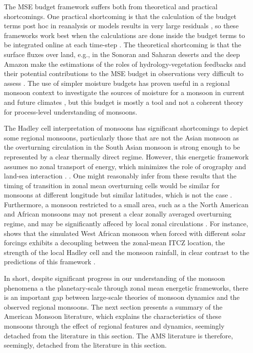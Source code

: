  The MSE budget framework suffers both from theoretical and practical shortcomings. One practical shortcoming is that the calculation of the budget terms post hoc in reanalysis or models results in very large residuals \citep{hill2019}, so these frameworks work best when the calculations are done inside the budget terms to be integrated online at each time-step \citep[e.g.][]{ma2019}.
The theoretical shortcoming is that the surface fluxes over land, e.g., in the Sonoran and Saharan deserts and the deep Amazon make the estimations of the roles of hydrology-vegetation feedbacks and their potential contributions to the MSE budget in observations very difficult to assess \citep{boos2016,pascale2019}. The use of simpler moisture budgets has proven useful in a regional monsoon context to investigate the sources of moisture for a monsoon in current  \citep{ordonez2019,martinez2019} and future climates \citep{smyth2020}, but this budget is mostly a tool and not a coherent theory for process-level understanding of monsoons.

 
The Hadley cell interpretation of monsoons has significant shortcomings to depict some regional monsoons, particularly those that are not the Asian monsoon as the overturning circulation in the South Asian monsoon is strong enough to be represented by a clear thermally direct regime.
However, this energetic framework assumes no zonal transport of energy, which minimizes the role of orography and land-sea interaction \citep{biasutti2018global}.
. One might reasonably infer from these results that the timing of transition in zonal mean overturning cells would be similar for monsoons at different longitude but similar latitudes, which is not the case \citep{wang2017}.
Furthermore, a monsoon restricted to a small area, such as a the North American and African monsoons may not present a clear zonally averaged overturning regime, and may be significantly affeced by local zonal circulations \citep{zhai2015regime}. For instance, \cite{smyth2018simulated} shows that the simulated West African monsoon when forced with different solar forcings exhibits a decoupling between the zonal-mean ITCZ location, the strength of the local Hadley cell and the monsoon rainfall, in clear contrast to the predictions of this framework \citep{bordoni2008monsoons}.


In short, despite significant progress in our understanding of the monsoon phenomena a the planetary-scale through zonal mean energetic frameworks, there is an important gap between large-scale theories of monsoon dynamics and the observed regional monsoons. 
The next section presents a summary of the American Monsoon literature, which explains the characteristics of these monsoons through the effect of regional features and dynamics, seemingly detached from the literature in this section. The AMS literature is therefore, seemingly, detached from the literature in this section.

